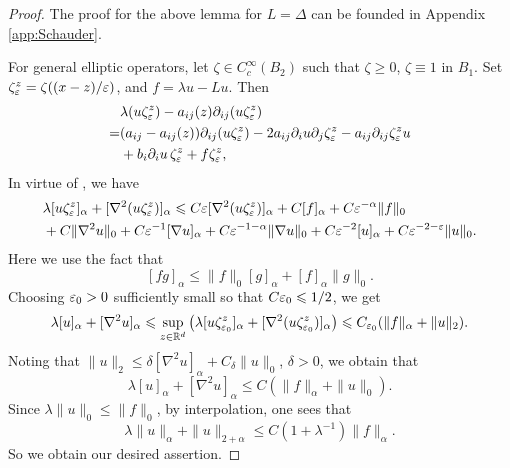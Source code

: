 \begin{proof}
    The proof for the above lemma for \(L=\Delta\) can be founded in Appendix \ref{app:Schauder}. 
    
    For general elliptic operators, let $\zeta\in C_c^\infty(B_2)$ such that $\zeta\geq 0$, $\zeta\equiv1$ in $B_1$. Set $\zeta_\varepsilon^z=\zeta((x-z)/\varepsilon)$, and \(f=\lambda u-L u\). Then 
    \begin{equation*}
        \begin{aligned}
            &\lambda (u\zeta_\varepsilon^z) - a_{ij}(z)\partial_{ij}(u\zeta_\varepsilon^z) \\
            =& (a_{ij}-a_{ij}(z)) \partial_{ij}(u\zeta_\varepsilon^z)-2a_{ij}\partial_i u\partial_{j}\zeta_\varepsilon^z -a_{ij}\partial_{ij}\zeta_\varepsilon^z u \\
            &+b_i\partial_iu \, \zeta^z_\varepsilon +f\zeta_\varepsilon^z, 
        \end{aligned}
    \end{equation*} 
    In virtue of ,  we have 
    \begin{equation*}
	\begin{aligned}
            &\lambda [u \zeta_\varepsilon^z]_\alpha+ [\nabla^2(u\zeta_\varepsilon^z)]_{\alpha}\leqslant  C
            \varepsilon [\nabla^2 (u\zeta_\varepsilon^z)]_\alpha+C [f]_\alpha +C \varepsilon^{-\alpha} \|f\|_0\\
            &+ C \|\nabla^2 u\|_0+C\varepsilon^{-1} [\nabla u]_\alpha + C\varepsilon^{-1-\alpha} \|\nabla u\|_0+ C \varepsilon^{-2} [u]_\alpha+ C \varepsilon^{-2-\varepsilon} \|u\|_0. 
	\end{aligned}
    \end{equation*}
    Here we use the fact that 
    \[
        [fg]_{\alpha}\leq \|f\|_{0}[g]_\alpha+ [f]_{\alpha}\|g\|_{0}. 
    \]
    Choosing \(\varepsilon_0>0\) sufficiently small so that \(C\varepsilon_0\leqslant 1/2\), we get 
    \begin{equation*}
        \begin{aligned}
        \lambda [u]_{\alpha} + [\nabla^2 u]_\alpha \leqslant \sup_{z\in {\mathbb R}^d} \left( \lambda [u \zeta_{\varepsilon_0}^z]_\alpha+ [\nabla^2(u\zeta_{\varepsilon_0}^z)]_{\alpha} \right) \leqslant  C_{\varepsilon_0} ( \|f\|_\alpha+ \|u\|_{2} ). 
    \end{aligned}
    \end{equation*}
    Noting that 
    \(\|u\|_2\leq \delta [\nabla^2 u]_\alpha+C_\delta \|u\|_0\), \(\delta>0\), we obtain that 
    \[
    \lambda [u]_{\alpha} + [\nabla^2 u]_\alpha \leq C (\|f\|_{\alpha}+ \|u\|_0). 
    \]
    Since \(\lambda \|u\|_0\leq \|f\|_0\), by interpolation, one sees that 
    \[
        \lambda \|u\|_{\alpha} + \|u\|_{2+\alpha} \leq C (1+\lambda^{-1}) \|f\|_{\alpha}.
    \]
    So we obtain our desired assertion. 
\end{proof}

